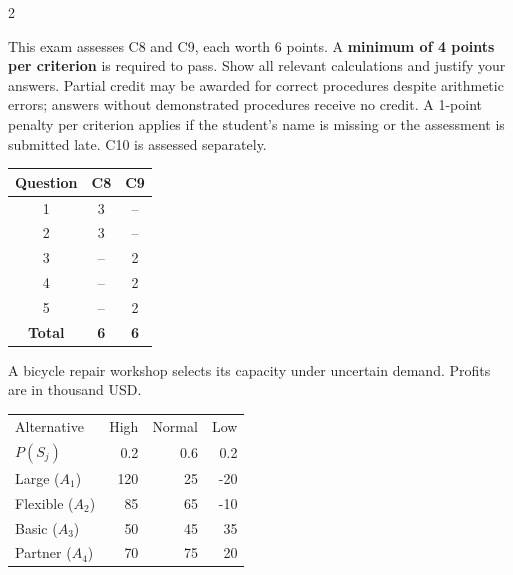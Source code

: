 	\begin{multicols}{2}
		\raggedcolumns
		
		This exam assesses C8 and C9, each worth 6 points. A \textbf{minimum of 4 points per criterion} is required to pass. Show all relevant calculations and justify your answers. Partial credit may be awarded for correct procedures despite arithmetic errors; answers without demonstrated procedures receive no credit. A 1-point penalty per criterion applies if the student's name is missing or the assessment is submitted late. C10 is assessed separately.
		
		\vspace{-3mm}
		\begin{center}
			\begin{tabular}{|c|c|c|}
				\hline
				\textbf{Question} & \textbf{C8} & \textbf{C9} \\ \hline
				1 & 3 & -- \\ \hline
				2 & 3 & -- \\ \hline
				3 & -- & 2 \\ \hline
				4 & -- & 2 \\ \hline
				5 & -- & 2 \\ \hline
				\textbf{Total} & \textbf{6} & \textbf{6} \\ \hline
			\end{tabular}
		\end{center}
		\vspace{-3mm}
		
		
		A bicycle repair workshop selects its capacity under uncertain demand. Profits are in thousand USD.
		
		\vspace{-3mm}
		\begin{center}\small\setlength{\tabcolsep}{4pt}
			\begin{tabular}{lrrr}\toprule
				Alternative & High & Normal & Low\\
				$P(S_j)$ & 0.2 & 0.6 & 0.2\\ \midrule
				Large ($A_1$) & 120 & 25 & -20\\
				Flexible ($A_2$) & 85 & 65 & -10\\
				Basic ($A_3$) & 50 & 45 & 35\\
				Partner ($A_4$) & 70 & 75 & 20\\
				\bottomrule
			\end{tabular}
		\end{center} \vspace*{-3mm}
		

\end{multicols}
